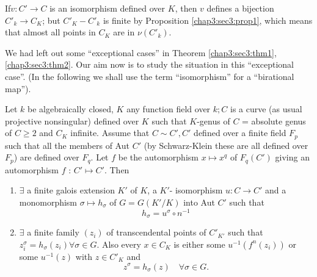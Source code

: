 \begin{remark*}%
  If\pageoriginale $v:C' \rightarrow C$ is an isomorphism defined  over $K$, then
  $v$ defines a bijection ${C'_{k}\rightarrow C_K}$; but ${C'_{K} -
    C'_k}$ is finite by Proposition \ref{chap3:sec3:prop1}, which means that almost all
  points in $C_K$ are in $\nu(C'_k)$. 
\end{remark*}

We had left out some ``exceptional cases'' in Theorem
\ref{chap3:sec3:thm1}, \ref{chap3:sec3:thm2}. Our aim 
now is to study the situation in this ``exceptional case''. (In the
following we shall use the term ``isomorphism'' for a ``birational
map''). 

\begin{theorem}\label{chap3:sec3:thm2}%
  Let $k$ be algebraically closed, $K$ any function field over $k; C$
  is a curve (as usual projective nonsingular) defined over $K$ such
  that $K$-genus of $C$ = absolute genus of $C \geq 2$ and $C_K$
  infinite. Assume that $C \sim C',C'$ defined over a finite field
  ${F}_p$ such that all the members of Aut $C'$ (by Schwarz-Klein
  these are all defined over ${F}_p$) are defined over ${F}_q$. Let
  $f$ be the automorphism $x\mapsto x^q$ of ${F}_q(C')$  giving an
  automorphism $f$ : $C'\mapsto C'$. Then  
  \begin{enumerate}[\rm (1)]
  \item $\exists$ a finite galois extension $K'$ of $K$, a $K'$-
    isomorphism $u : C \rightarrow C'$ and a monomorphism $\sigma
    \mapsto h_{\sigma}$ of $G = G(K'/K)$ into Aut $C'$ such that  
    $$ 
     {h_{\sigma} = u^{\sigma}\circ n^{-1}}
    $$
   \item $\exists$ a finite family $(z{_i})$ of transcendental points
     of $C'_{K'}$  such that $z^{\sigma}_{i} =
     h_{\sigma}(z_i)\forall\sigma\in G$. Also every $x\in C_K$ is
     either some $u^{-1}(f^{n}(z_i))$ or some $u^{-1}(z)$ with $z\in
     C'_K$ and  
     $$
     {z^{\sigma} = h_{\sigma}(z)\quad  \forall\sigma\in G.}
     $$
  \end{enumerate}
\end{theorem}

